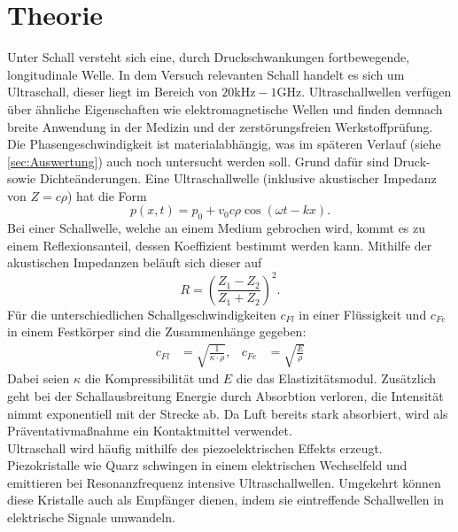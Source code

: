 \section{Theorie}
\label{sec:Theorie}

Unter Schall versteht sich eine, durch Druckschwankungen fortbewegende, 
longitudinale Welle.
In dem Versuch relevanten Schall handelt es sich um Ultraschall, dieser liegt
im Bereich von $20 \unit{\kilo\hertz} - 1 \unit{\giga\hertz}$.
Ultraschallwellen verfügen über ähnliche Eigenschaften wie elektromagnetische
Wellen und finden demnach breite Anwendung in der Medizin und der
zerstörungsfreien Werkstoffprüfung. Die Phasengeschwindigkeit ist materialabhängig,
was im späteren Verlauf (siehe \autoref{sec:Auswertung}) auch noch untersucht
werden soll. Grund dafür sind Druck- sowie Dichteänderungen.
Eine Ultraschallwelle (inklusive akustischer Impedanz von $Z=c \rho$) hat die 
Form
\begin{equation}
    \label{eqn:1}
    p(x,t) = p_0 + v_0 c \rho \cos(\omega t - kx).
\end{equation}
Bei einer Schallwelle, welche an einem Medium gebrochen wird, kommt es zu einem 
Reflexionsanteil, dessen Koeffizient bestimmt werden kann. Mithilfe der akustischen
Impedanzen beläuft sich dieser auf
\begin{equation}
    R = \left( \frac{Z_1 - Z_2}{Z_1 + Z_2} \right)^2.
\end{equation}
Für die unterschiedlichen Schallgeschwindigkeiten $c_{Fl}$ in einer Flüssigkeit 
und $c_{Fe}$ in einem Festkörper sind die Zusammenhänge gegeben:
\begin{align}
    \label{eqn:2}
    c_{Fl} &= \sqrt{\frac{1}{\kappa \cdot \rho}}, & c_{Fe} &= \sqrt{\frac{E}{\rho}}
\end{align}
\noindent Dabei seien $\kappa$ die Kompressibilität und $E$ die das 
Elastizitätsmodul. Zusätzlich geht bei der Schallausbreitung Energie durch 
Absorbtion verloren, die Intensität nimmt exponentiell mit der Strecke ab.
Da Luft bereits stark absorbiert, wird als Präventativmaßnahme ein 
Kontaktmittel verwendet.
\vspace{0.5em}
\\
\noindent Ultraschall wird häufig mithilfe des piezoelektrischen Effekts erzeugt.
Piezokristalle wie Quarz schwingen in einem elektrischen Wechselfeld und
emittieren bei Resonanzfrequenz intensive Ultraschallwellen. Umgekehrt können
diese Kristalle auch als Empfänger dienen, indem sie eintreffende Schallwellen
in elektrische Signale umwandeln.
\vspace{0.5em}
